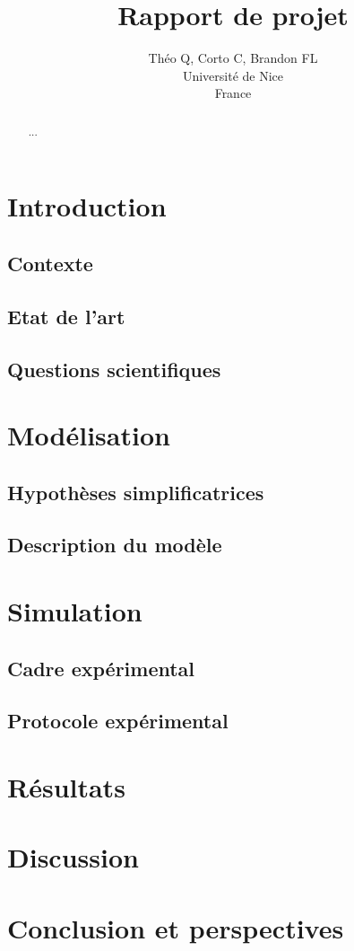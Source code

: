 \documentclass{article}
\title{Rapport de projet}
\author{Théo Q, Corto C, Brandon FL \\
Université de Nice\\
France}
\begin{document}
\maketitle


\begin{abstract} ... \end{abstract}
\section*{Introduction}
\subsection{Contexte}
\subsection{Etat de l'art}
\subsection{Questions scientifiques}
\section{Modélisation}
\subsection{Hypothèses simplificatrices}
\subsection{Description du modèle}
\section{Simulation}
\subsection{Cadre expérimental}
\subsection{Protocole expérimental}
\section{Résultats}
\section{Discussion}
\section*{Conclusion et perspectives}
\end{document}
